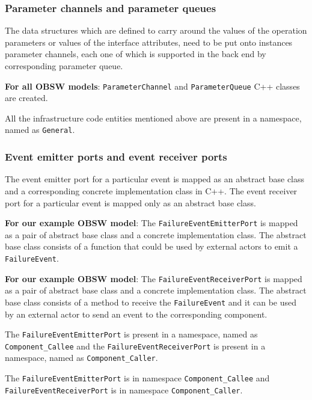 \subsubsection{\textbf{Parameter channels and parameter queues}}
The data structures which are defined to carry around the values of the operation parameters or values of the interface attributes, need to be put onto instances parameter channels, each one of which is supported in the back end by corresponding parameter queue.

\textbf{For all OBSW models}: \texttt{Parameter\allowbreak Channel} and \texttt{Parameter\allowbreak Queue} C++ classes are created.

All the infrastructure code entities mentioned above are present in a namespace, named as \texttt{General}.   

\subsubsection{\textbf{Event emitter ports and event receiver ports}}
The event emitter port for a particular event is mapped as an abstract base class and a corresponding concrete implementation class in C++. The event receiver port for a particular event is mapped only as an abstract base class.  

\textbf{For our example OBSW model}: The \texttt{FailureEvent\allowbreak EmitterPort} is mapped as a pair of abstract base class and a concrete implementation class. The abstract base class consists of a function that could be used by external actors to emit a \texttt{FailureEvent}.  

\textbf{For our example OBSW model}: The \texttt{FailureEvent\allowbreak ReceiverPort} is mapped as a pair of abstract base class and a concrete implementation class. The abstract base class consists of a method to receive the \texttt{FailureEvent} and it can be used by an external actor to send an event to the corresponding component.

The \texttt{FailureEvent\allowbreak EmitterPort} is present in a namespace, named as \texttt{Component\allowbreak\_Callee} and the \texttt{FailureEvent\texttt ReceiverPort} is present in a namespace, named as \texttt{Component\_Caller}. 

The \texttt{FailureEvent\allowbreak Emitter\allowbreak Port} is in namespace \texttt{Component\allowbreak \_Callee} and \texttt{FailureEvent\allowbreak Receiver\allowbreak Port} is in namespace \texttt{Component\allowbreak\_Caller}.

